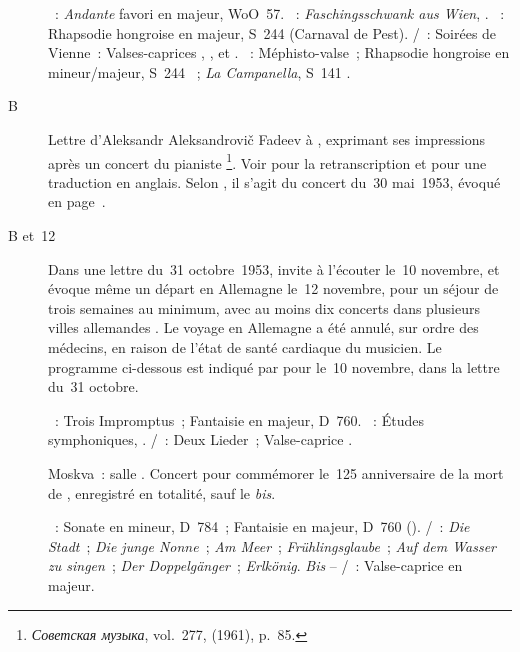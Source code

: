 \begin{description}
 \textsc{\Beethoven{}}~: \emph{Andante} favori en \kF majeur, WoO~57.
 \textsc{\Schumann{}}~: \emph{Faschingsschwank aus Wien}, .
 \textsc{\Liszt{}}~: Rhapsodie hongroise  en \kE \Flat majeur,
 S~244  (Carnaval de Pest).
 \textsc{\Schubert{}/\Liszt{}}~: Soirées de Vienne~: Valses-caprices
 , ,  et .
 \textsc{\Liszt{}}~: Méphisto-valse~; Rhapsodie hongroise  en \kC
 \Sharp mineur/\kF \Sharp majeur, S~244 ~; \emph{La Campanella},
 S~141 .
 \item[B\DateWithWeekDay{1953-11-06}]
 Lettre d'\hbox{Aleksandr} Aleksandrovič Fadeev à \VSofronitsky{}, exprimant
 ses impressions après un concert du pianiste%
 \footnote{\foreignlanguage{russian}{\emph{Советская музыка}}, vol.~277,
  (1961), p.~85.}.
 Voir \citet[p.~432]{Milshteyn82a} pour la retranscription et
 \citet[p.~12-13]{White} pour une traduction en anglais.
 Selon \citet[p.~175]{Nekrasova08}, il s'agit du concert du~30 mai~1953,
 évoqué en page~\pageref{rec:1953-05-30}.
 \item[B\DateWithWeekDay{1953-11-10} et~12]
 Dans une lettre du~31 octobre~1953, \VSofronitsky{} invite à l'écouter
 le~10 novembre, et évoque même un départ en Allemagne le~12 novembre, pour
 un séjour de trois semaines au minimum, avec au moins dix concerts dans
 plusieurs villes allemandes \citep[voir][p.~175]{Nekrasova08}.
 Le voyage en Allemagne a été annulé, sur ordre des médecins, en raison de
 l'état de santé cardiaque du musicien.
 Le programme ci-dessous est indiqué par \Sofronitsky{} pour le~10 novembre,
 dans la lettre du~31 octobre.

 \textsc{\Schubert{}}~: Trois Impromptus~; Fantaisie en \kC majeur, D~760.
 \textsc{\Schumann{}}~: Études symphoniques, .
 \textsc{\Schubert{}/\Liszt{}}~: Deux Lieder~; Valse-caprice .
 \item[\DateWithWeekDay{1953-12-25}]
 Moskva~: salle \Tchaikovski{}.
 Concert pour commémorer le~125\ieme{} anniversaire de la mort de
 \Schubert{}, enregistré en totalité, sauf le \emph{bis}.

 \textsc{\Schubert{}}~: Sonate en \kA mineur, D~784~; Fantaisie en \kC
 majeur, D~760 ().
 \textsc{\Schubert{}/\Liszt{}}~: \emph{Die Stadt}~; \emph{Die junge Nonne}~;
 \emph{Am Meer}~; \emph{Frühlingsglaube}~; \emph{Auf dem Wasser zu singen}~;
 \emph{Der Doppelgänger}~; \emph{Erlkönig}.
 \emph{Bis} -- \textsc{\Schubert{}/\Liszt{}}~: Valse-caprice en \kD majeur.
\end{description}

